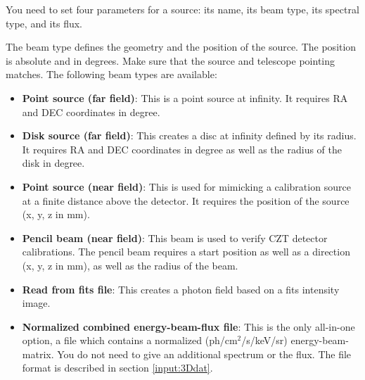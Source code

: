 You need to set four parameters for a source: its name, its beam type, its spectral type, and its flux.

The beam type defines the geometry and the position of the source. The position is absolute and in degrees. Make sure that the source and telescope pointing matches. The following beam types are available:
 \begin{itemize}
 \item \textbf{Point source (far field)}: This is a point source at infinity. It requires RA and DEC coordinates in degree.
 \item \textbf{Disk source (far field)}: This creates a disc at infinity defined by its radius. It requires RA and DEC coordinates in degree as well as the radius of the disk in degree.
 \item \textbf{Point source (near field)}: This is used for mimicking a calibration source at a finite distance above the detector. It requires the position of the source (x, y, z in mm).
 \item \textbf{Pencil beam (near field)}: This beam is used to verify CZT detector calibrations. The pencil beam requires a start position as well as a direction (x, y, z in mm), as well as the radius of the beam.  
 \item \textbf{Read from fits file}: This creates a photon field based on a fits intensity image.
 \item \textbf{Normalized combined energy-beam-flux file}: This is the only all-in-one option, a file which contains a normalized (ph/cm$^2$/s/keV/sr) energy-beam-matrix. You do not need to give an additional spectrum or the flux. The file format is described in section \ref{input:3Ddat}.
 \end{itemize}
 
